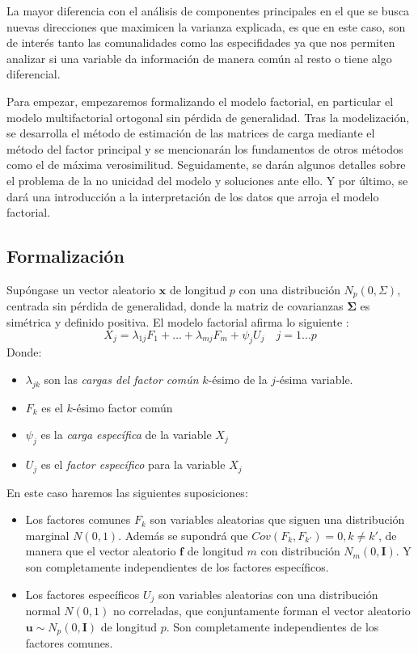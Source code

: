 \noindent La mayor diferencia con el análisis de componentes principales en el que se busca nuevas direcciones que maximicen la varianza explicada, es que en este caso, son de interés tanto las comunalidades como las especifidades ya que nos permiten analizar si una variable da información de manera común al resto o tiene algo diferencial. 

\noindent Para empezar, empezaremos formalizando el modelo factorial, en particular el modelo multifactorial ortogonal \cite{Johnson 2007} sin pérdida de generalidad. Tras la modelización, se desarrolla el método de estimación de las matrices de carga mediante el método del factor principal \cite{Peña 2002} y se mencionarán los fundamentos de otros métodos como el de  máxima verosimilitud. Seguidamente, se darán algunos detalles sobre el problema de la no unicidad del modelo y soluciones ante ello. Y por último, se dará una introducción a la interpretación de los datos que arroja el modelo factorial. 

\newpage
\subsection{Formalización}
\noindent Supóngase un vector aleatorio $\mathbf{x}$ de longitud $p$ con una distribución $N_p(0,\Sigma)$, centrada sin pérdida de generalidad, donde la matriz de covarianzas $\mathbf{\Sigma}$ es simétrica y definido positiva. El modelo factorial afirma lo siguiente \cite{Chatfield 1989}:  
\begin{equation}\label{eq Fact}
X_j= \lambda_{1j}F_1+\ldots+\lambda_{mj}F_m+\psi_j U_j\quad j=1\ldots p 
\end{equation}
\noindent Donde:
\begin{itemize}
\item $\lambda_{jk}$ son las \emph{cargas del factor común} $k$-ésimo de la $j$-ésima variable.
\item $F_k$ es el $k$-ésimo factor común
\item $\psi_j$ es la \emph{carga específica} de la variable $X_j$
\item $U_j$ es el \emph{factor específico} para la variable $X_j$
\end{itemize}

\noindent En este caso haremos las siguientes suposiciones\cite{Cuadras 2014}:
\begin{itemize}
\item Los factores comunes $F_k$ son variables aleatorias que siguen una distribución marginal $N(0,1)$. Además se supondrá que $Cov(F_k,F_{k'})=0, k\neq k'$, de manera que el vector aleatorio $\mathbf{f}$ de longitud $m$ con distribución $N_m(0,\mathbf{I})$. Y son completamente independientes de los factores específicos. 

\item Los factores específicos $U_j$ son variables aleatorias con una distribución normal $N(0,1)$ no correladas, que conjuntamente forman el vector aleatorio $\mathbf{u}\sim N_p(0,\mathbf{I})$ de longitud $p$. Son completamente independientes de los factores comunes. 
\end{itemize}


